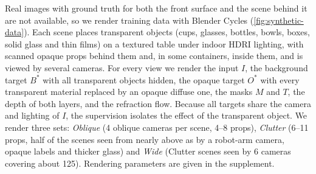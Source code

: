 Real images with ground truth for both the front surface and the scene behind it are not available, so we render training data with Blender Cycles (\cref{fig:synthetic-data}).
Each scene places transparent objects (cups, glasses, bottles, bowls, boxes, solid glass and thin films) on a textured table under indoor HDRI lighting, with scanned opaque props behind them and, in some containers, inside them, and is viewed by several cameras.
For every view we render the input $I$, the background target $B^*$ with all transparent objects hidden, the opaque target $O^*$ with every transparent material replaced by an opaque diffuse one, the masks $M$ and $T$, the depth of both layers, and the refraction flow.
Because all targets share the camera and lighting of $I$, the supervision isolates the effect of the transparent object.
We render three sets: \emph{Oblique} (4 oblique cameras per scene, 4--8 props), \emph{Clutter} (6--11 props, half of the scenes seen from nearly above as by a robot-arm camera, opaque labels and thicker glass) and \emph{Wide} (Clutter scenes seen by 6 cameras covering about 125\textdegree).
Rendering parameters are given in the supplement.
